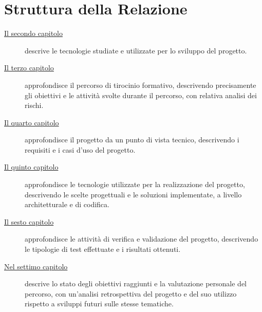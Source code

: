 \section{Struttura della Relazione}

\begin{description}
    \item[{\hyperref[cap:chapter2]{Il secondo capitolo}}] descrive le tecnologie studiate e utilizzate per lo sviluppo del progetto.
    \item[{\hyperref[cap:chapter2]{Il terzo capitolo}}] approfondisce il percorso di tirocinio formativo, descrivendo precisamente gli obiettivi e le attività svolte durante il percorso, con relativa analisi dei rischi.
    \item[{\hyperref[cap:chapter2]{Il quarto capitolo}}] approfondisce il progetto da un punto di vista tecnico, descrivendo i requisiti e i casi d'uso del progetto.
    \item[{\hyperref[cap:chapter2]{Il quinto capitolo}}] approfondisce le tecnologie utilizzate per la realizzazione del progetto, descrivendo le scelte progettuali e le soluzioni implementate, a livello architetturale e di codifica.
    \item[{\hyperref[cap:chapter2]{Il sesto capitolo}}] approfondisce le attività di verifica e validazione del progetto, descrivendo le tipologie di test effettuate e i risultati ottenuti.
    \item[{\hyperref[cap:chapter2]{Nel settimo capitolo}}] descrive lo stato degli obiettivi raggiunti e la valutazione personale del percorso, con un'analisi retrospettiva del progetto e del suo utilizzo rispetto a sviluppi futuri sulle stesse tematiche.
\end{description}